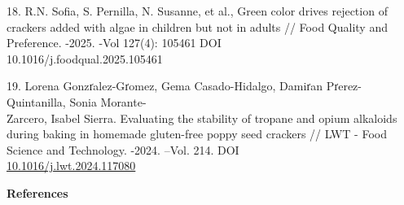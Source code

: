 \begin{references}
18.  R.N. Sofia, S. Pernilla, N. Susanne, et al., Green color drives
rejection of crackers added with algae in children but not in adults
// Food Quality and Preference. -2025. -Vol 127(4): 105461
DOI \\10.1016/j.foodqual.2025.105461

19.  Lorena Gonzґalez-Gґomez, Gema Casado-Hidalgo, Damiґan
Pґerez-Quintanilla, Sonia Morante-\\Zarcero, Isabel Sierra. Evaluating
the stability of tropane and opium alkaloids during baking in homemade
gluten-free poppy seed crackers // LWT - Food Science and Technology.
-2024. --Vol. 214. DOI\\
\href{https://doi.org/10.1016/j.lwt.2024.117080}{10.1016/j.lwt.2024.117080}
\end{references}

\begin{center}
{\bfseries References}
\end{center}

